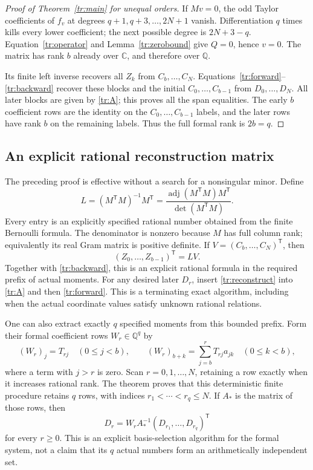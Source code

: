 \begin{proof}[Proof of Theorem~\ref{tr:main} for unequal orders]
If $Mv=0$, the odd Taylor coefficients of $f_v$ at degrees
$q+1,q+3,\ldots,2N+1$ vanish. Differentiation $q$ times kills every
lower coefficient; the next possible degree is $2N+3-q$.
Equation~\eqref{tr:operator} and Lemma~\ref{tr:zerobound} give $Q=0$,
hence $v=0$. The matrix has rank $b$ already over $\mathbb C$, and
therefore over $\mathbb Q$.

Its finite left inverse recovers all $Z_k$ from $C_b,\ldots,C_N$.
Equations~\eqref{tr:forward}--\eqref{tr:backward} recover these blocks
and the initial $C_0,\ldots,C_{b-1}$ from $D_0,\ldots,D_N$.
All later blocks are given by \eqref{tr:A}; this proves all the span
equalities. The early $b$ coefficient rows are the identity on the
$C_0,\ldots,C_{b-1}$ labels, and the later rows have rank $b$ on
the remaining labels. Thus the full formal rank is $2b=q$.
\end{proof}

\subsection{An explicit rational reconstruction matrix}

The preceding proof is effective without a search for a nonsingular
minor. Define
\begin{equation}\label{tr:leftinverse}
 L=(M^{\mathsf T}M)^{-1}M^{\mathsf T}
   =\frac{\operatorname{adj}(M^{\mathsf T}M)M^{\mathsf T}}
          {\det(M^{\mathsf T}M)}.
\end{equation}
Every entry is an explicitly specified rational number obtained from
the finite Bernoulli formula. The denominator is nonzero because $M$
has full column rank; equivalently its real Gram matrix is positive
definite. If $V=(C_b,\ldots,C_N)^{\mathsf T}$, then
\begin{equation}\label{tr:reconstruct}
 (Z_0,\ldots,Z_{b-1})^{\mathsf T}=LV.
\end{equation}
Together with \eqref{tr:backward}, this is an explicit rational formula
in the required prefix of actual moments. For any desired later $D_r$,
insert \eqref{tr:reconstruct} into \eqref{tr:A} and then
\eqref{tr:forward}. This is a terminating exact algorithm, including
when the actual coordinate values satisfy unknown rational relations.

One can also extract exactly $q$ specified moments from this bounded
prefix. Form their formal coefficient rows $W_r\in\mathbb Q^q$ by
\[
 (W_r)_j=T_{rj}\quad(0\le j<b),\qquad
 (W_r)_{b+k}=\sum_{j=b}^r T_{rj}a_{jk}\quad(0\le k<b),
\]
where a term with $j>r$ is zero. Scan $r=0,1,\ldots,N$, retaining a
row exactly when it increases rational rank. The theorem proves that
this deterministic finite procedure retains $q$ rows, with indices
$r_1<\cdots<r_q\le N$. If $A_*$ is the matrix of those rows, then
\[
 D_r=W_rA_*^{-1}(D_{r_1},\ldots,D_{r_q})^{\mathsf T}
\]
for every $r\ge0$. This is an explicit basis-selection algorithm for
the formal system, not a claim that its $q$ actual numbers form an
arithmetically independent set.

